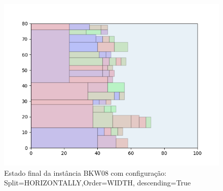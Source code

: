 \begin{figure}[H]
    \centering
    \caption[]{Estado final da instância BKW08 com configuração: Split=HORIZONTALLY,Order=WIDTH, descending=True}
    \label{fig:bkw08-horizontally-width-true}
    \includegraphics[scale=0.5]{output/figures/bkw/bkw08/horizontally/width/true/00}
\end{figure}